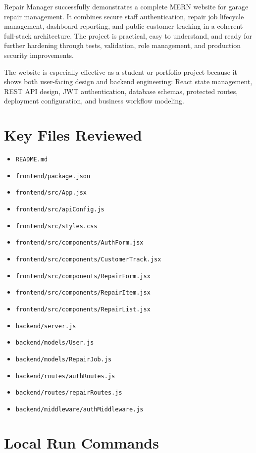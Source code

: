 \documentclass[12pt,a4paper]{report}
\newcommand{\projectname}{Repair Manager}
\begin{document}
\projectname{} successfully demonstrates a complete MERN website for garage repair management. It combines secure staff authentication, repair job lifecycle management, dashboard reporting, and public customer tracking in a coherent full-stack architecture. The project is practical, easy to understand, and ready for further hardening through tests, validation, role management, and production security improvements.

The website is especially effective as a student or portfolio project because it shows both user-facing design and backend engineering: React state management, REST API design, JWT authentication, database schemas, protected routes, deployment configuration, and business workflow modeling.

\appendix
\chapter{Key Files Reviewed}

\begin{itemize}
  \item \texttt{README.md}
  \item \texttt{frontend/package.json}
  \item \texttt{frontend/src/App.jsx}
  \item \texttt{frontend/src/apiConfig.js}
  \item \texttt{frontend/src/styles.css}
  \item \texttt{frontend/src/components/AuthForm.jsx}
  \item \texttt{frontend/src/components/CustomerTrack.jsx}
  \item \texttt{frontend/src/components/RepairForm.jsx}
  \item \texttt{frontend/src/components/RepairItem.jsx}
  \item \texttt{frontend/src/components/RepairList.jsx}
  \item \texttt{backend/server.js}
  \item \texttt{backend/models/User.js}
  \item \texttt{backend/models/RepairJob.js}
  \item \texttt{backend/routes/authRoutes.js}
  \item \texttt{backend/routes/repairRoutes.js}
  \item \texttt{backend/middleware/authMiddleware.js}
\end{itemize}

\chapter{Local Run Commands}
\end{document}
